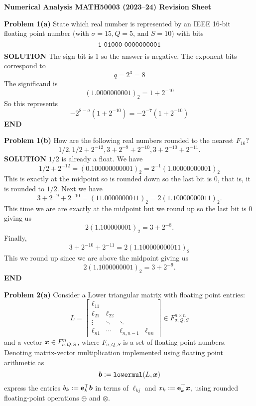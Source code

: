 \documentclass[12pt,a4paper]{article}
\def\endash{–}
\def\x{ {\vc x} }
\def\b{ {\vc b} }
\begin{document}
\textbf{Numerical Analysis MATH50003 (2023\ensuremath{\endash}24) Revision Sheet}

\textbf{Problem 1(a)} State which real number is represented by an IEEE 16-bit floating point number (with $\ensuremath{\sigma} = 15, Q = 5$, and $S = 10$) with bits
\[
{\tt 1\ 01000\ 0000000001}
\]
\textbf{SOLUTION} The sign bit is 1 so the answer is negative. The exponent bits correspond to
\[
q = 2^3 = 8
\]
The significand is
\[
(1.0000000001)_2 = 1 + 2^{-10}
\]
So this represents
\[
-2^{8-\ensuremath{\sigma}} (1 + 2^{-10}) = - 2^{-7} (1 + 2^{-10})
\]
\textbf{END}

\textbf{Problem 1(b)}  How are the following real numbers rounded to the nearest $F_{16}$?
\[
1/2, 1/2 + 2^{-12}, 3 + 2^{-9} + 2^{-10}, 3 + 2^{-10} + 2^{-11}.
\]
\textbf{SOLUTION} $1/2$ is already a float. We have
\[
1/2 + 2^{-12} = (0.100000000001)_2 = 2^{-1} (1.00000000001)_2
\]
This is exactly at the midpoint so is rounded down so the last bit is 0, that is, it is rounded to $1/2$.  Next we have
\[
3 + 2^{-9}  + 2^{-10} = (11.0000000011)_2 = 2(1.10000000011)_2.
\]
This time we are are exactly at the midpoint but we round up so the last bit is 0 giving us
\[
2(1.100000001)_2 = 3 + 2^{-8}.
\]
Finally,
\[
3 + 2^{-10} + 2^{-11} = 2(1.100000000011)_2
\]
This we round up since we are above the midpoint giving us
\[
2(1.1000000001)_2 = 3 + 2^{-9}.
\]
\textbf{END}

\textbf{Problem 2(a)} Consider a Lower triangular matrix with floating point entries:
\[
L = \begin{bmatrix}
\ensuremath{\ell}_{11} \\
 \ensuremath{\ell}_{21} & \ensuremath{\ell}_{22} \\
 \ensuremath{\vdots} & \ensuremath{\ddots} & \ensuremath{\ddots} \\
 \ensuremath{\ell}_{n1} & \ensuremath{\cdots} & \ensuremath{\ell}_{n,n-1} & \ensuremath{\ell}_{nn}
 \end{bmatrix} \ensuremath{\in} F_{\ensuremath{\sigma},Q,S}^{n \ensuremath{\times} n}
\]
and a vector $\ensuremath{\bm{\x}} \in F_{\ensuremath{\sigma},Q,S}^{n}$, where $F_{\ensuremath{\sigma},Q,S}$ is a set of floating-point numbers. Denoting matrix-vector multiplication implemented using floating point arithmetic as
\[
\ensuremath{\bm{\b}} := {\tt lowermul}(L,\ensuremath{\bm{\x}})
\]
express the entries $b_k := {\bf e}_k^\ensuremath{\top} \ensuremath{\bm{\b}}$  in terms of $\ensuremath{\ell}_{kj}$ and $x_k := {\bf e}_k^\ensuremath{\top} \ensuremath{\bm{\x}}$,  using rounded floating-point operations $\ensuremath{\oplus}$ and $\ensuremath{\otimes}$.
\end{document}
